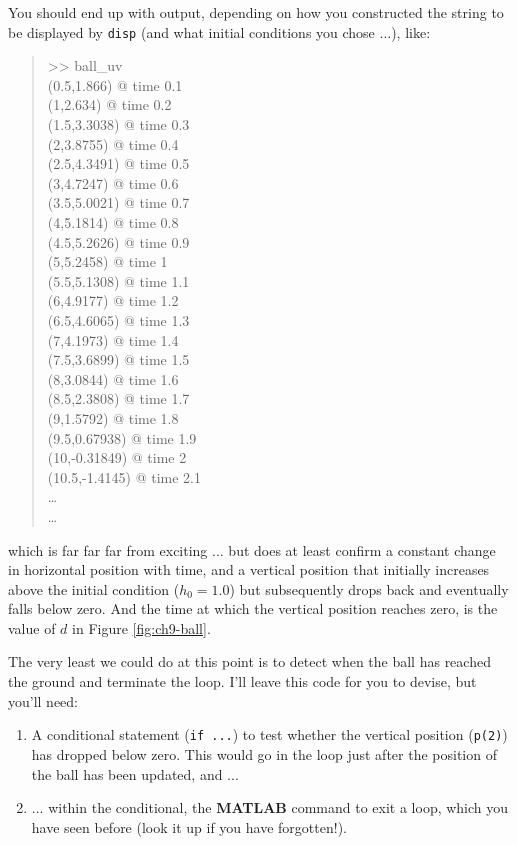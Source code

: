 \documentclass{tufte-book} %
\newenvironment{docspecmargin}{\begin{quotation}\ttfamily\footnotesize\parskip0pt\parindent0pt\ignorespaces}{\end{quotation}}
\begin{document}
You should end up with output, depending on how you constructed the string to be displayed by \texttt{disp} (and what initial conditions you chose ...), like:
\begin{docspecmargin}
>> ball\_uv
\\(0.5,1.866) @ time 0.1
\\(1,2.634) @ time 0.2
\\(1.5,3.3038) @ time 0.3
\\(2,3.8755) @ time 0.4
\\(2.5,4.3491) @ time 0.5
\\(3,4.7247) @ time 0.6
\\(3.5,5.0021) @ time 0.7
\\(4,5.1814) @ time 0.8
\\(4.5,5.2626) @ time 0.9
\\(5,5.2458) @ time 1
\\(5.5,5.1308) @ time 1.1
\\(6,4.9177) @ time 1.2
\\(6.5,4.6065) @ time 1.3
\\(7,4.1973) @ time 1.4
\\(7.5,3.6899) @ time 1.5
\\(8,3.0844) @ time 1.6
\\(8.5,2.3808) @ time 1.7
\\(9,1.5792) @ time 1.8
\\(9.5,0.67938) @ time 1.9
\\(10,-0.31849) @ time 2
\\(10.5,-1.4145) @ time 2.1
\\ \ldots 
\\ \ldots 
\end{docspecmargin}
which is far far far from exciting ... but does at least confirm a constant change in horizontal position with time, and a vertical position that initially increases above the initial condition (\(h_{0}=1.0\)) but subsequently drops back and eventually falls below zero. And the time at which the vertical position reaches zero, is the value of \(d\) in  Figure \ref{fig:ch9-ball}.

The very least we could do at this point is to detect when the ball has reached the ground and terminate the loop. I'll leave this code for you to devise, but you'll need:
\vspace{-1mm}\begin{enumerate}[noitemsep]
\setlength{\itemindent}{.2in}
\item A conditional statement (\texttt{if ...}) to test whether the vertical position (\texttt{p(2)}) has dropped below zero. This would go in the loop just after the position of the ball has been updated, and  ...
\item ... within the conditional, the \textbf{MATLAB} command to exit a loop, which you have seen before (look it up if you have forgotten!).
\end{enumerate}\vspace{-1mm}
\end{document}

